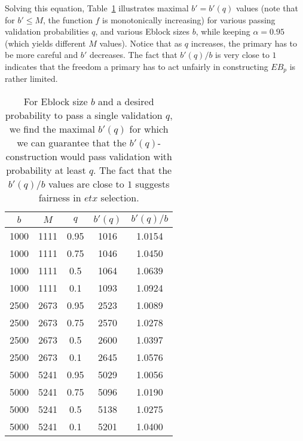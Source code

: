 Solving this equation, Table~\ref{tab:table2} illustrates maximal $b'=b'(q)$ values (note that for $b'\leq M$, the function $f$ is monotonically increasing) for various passing validation probabilities $q$, and various Eblock sizes $b$, while keeping $\alpha=0.95$ (which yields different $M$ values). Notice that as $q$ increases, the primary has to be more careful and $b'$ decreases. The fact that $b'(q)/b$ is very close to $1$ indicates that the freedom a primary has to act unfairly in constructing $EB_p$ is rather limited.


\begin{table}[h!]
  \begin{center}
    \caption{For Eblock size $b$ and a desired probability to pass a single validation $q$, we find the maximal $b'(q)$ for which we can guarantee that the $b'(q)$-construction would pass validation with probability at least $q$. The fact that the $b'(q)/b$ values are close to $1$ suggests fairness in $etx$ selection.}
    \label{tab:table2}
    \begin{tabular}{c|c|c|c|c} %
      $b$ & $M$ & $q$ & $b'(q)$ & $b'(q)/b$ \\
      \hline 
1000  &  1111  &  0.95  &  1016  &  1.0154\\
1000  &  1111  &  0.75  &  1046  &  1.0450\\
1000  &  1111  &  0.5  &  1064  &  1.0639\\
1000  &  1111  &  0.1  &  1093  &  1.0924 \\
2500  &  2673  &  0.95  &  2523  &  1.0089 \\
2500  &  2673  &  0.75  &  2570  &  1.0278 \\
2500  &  2673  &  0.5  &  2600  &  1.0397 \\ 
2500  &  2673  &  0.1  &  2645  &  1.0576 \\
5000  &  5241  &  0.95  &  5029  &  1.0056 \\ 
5000  &  5241  &  0.75  &  5096  &  1.0190 \\
5000  &  5241  &  0.5  &  5138  &  1.0275 \\
5000  &  5241  &  0.1  &  5201  &  1.0400 \\

\end{tabular}
\end{center}
\end{table}
